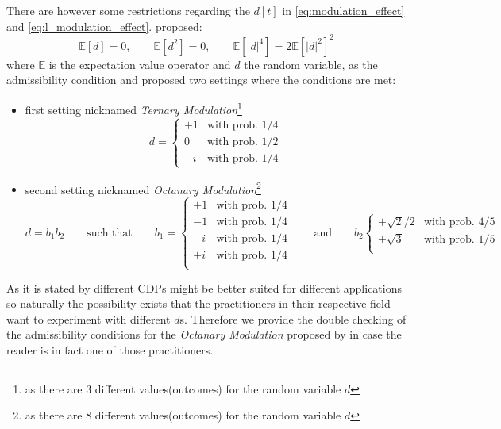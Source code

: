 There are however some restrictions regarding the $d[t]$ in \cref{eq:modulation_effect} and \cref{eq:l_modulation_effect}. \cite{ECXLMS2013} proposed:
\begin{equation}
	\mathbb{E}\left[d\right] = 0, \qquad \mathbb{E}\left[d^2\right] = 0, \qquad\mathbb{E}\left[\left|d\right|^4\right] = 2\mathbb{E}\left[\left|d\right|^2\right]^2
\end{equation}
where $\mathbb{E}$ is the expectation value operator and $d$ the random variable, as the admissibility condition and proposed two settings where the conditions are met:
\begin{itemize}
	\item first setting nicknamed \emph{Ternary Modulation}\footnote{as there are 3 different values(outcomes) for the random variable $d$}
	\begin{equation*}
	  d =
		  \begin{cases}
			  +1 & \text{with prob.  $1/4$}\\
			  0 & \text{with prob.  $1/2$}\\
			  -i & \text{with prob.  $1/4$}
		  \end{cases}  
	\end{equation*}
	\item second setting nicknamed \emph{Octanary Modulation}\footnote{as there are 8 different values(outcomes) for the random variable $d$}
	\begin{equation*}
		d = b_1b_2 \qquad \text{such that} \qquad
	  b_1 =
		  \begin{cases}
			  +1 & \text{with prob.  $1/4$}\\
			  -1 & \text{with prob.  $1/4$}\\
			  -i & \text{with prob.  $1/4$}\\
			  +i & \text{with prob.  $1/4$}\\
	
		  \end{cases}  
		  \qquad \text{and} \qquad 
	  b_2 
		  \begin{cases}  
			+\sqrt{2}/2 & \text{with prob.  $4/5$}\\
			+\sqrt{3} & \text{with prob.  $1/5$}\\
		\end{cases}   
	\end{equation*}
\end{itemize}

As it is stated by \cite{ECXLMS2013} different \acl*{CDP}s might be better suited for different applications so naturally 
the possibility exists that the practitioners in their respective field want to experiment with different $d$s. Therefore 
we provide the double checking of the admissibility conditions for the \emph{Octanary Modulation} proposed by \cite{Candes2014} 
in case the reader is in fact one of those practitioners.

